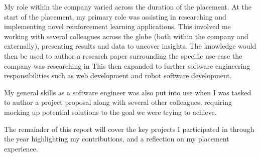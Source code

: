 My role within the company varied across the duration of the placement.
At the start of the placement, my primary role was assisting in researching and implementing
novel reinforcement learning applications.
This involved me working with several colleagues across the globe
(both within the company and externally), presenting results and data to uncover insights.
The knowledge would then be used to author a research paper surrounding the specific use-case
the company was researching in %
This then expanded to further software engineering responsibilities such as web development
and robot software development.

My general skills as a software engineer was also put into use when I was tasked
to author a project proposal along with several other colleagues, %
requiring mocking up potential solutions to the goal we were trying to achieve.

The remainder of this report will cover the key projects I participated in through the year
highlighting my contributions, and a reflection on my placement experience.

